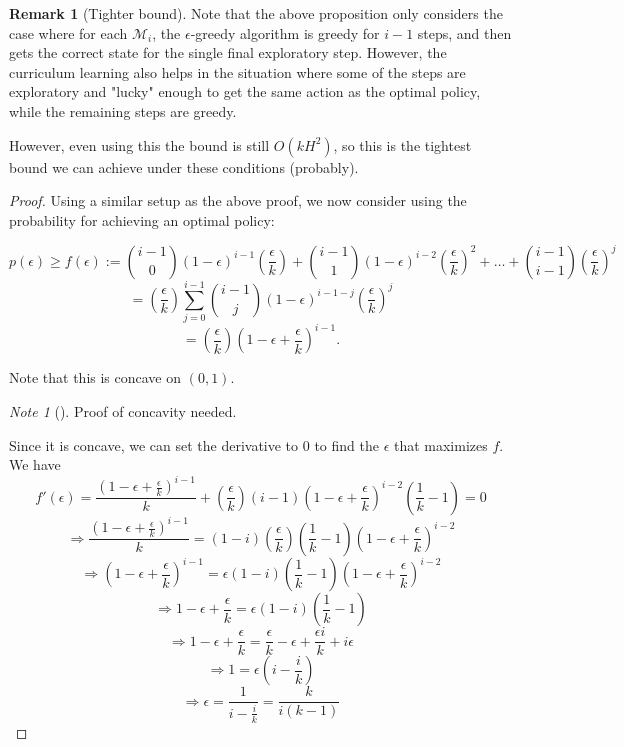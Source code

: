 \documentclass[12pt, letterpaper]{article}
\theoremstyle{definition}
\newtheorem*{rmk}{Remark}
\theoremstyle{remark}
\newtheorem*{note}{Note}
\begin{document}
\begin{rmk}[Tighter bound]
    Note that the above proposition only considers the case where for each \(\mathcal{M}_i\), the \(\epsilon\)-greedy algorithm is greedy for \(i-1\) steps, and then gets the correct state for the single final exploratory step. However, the curriculum learning also helps in the situation where some of the steps are exploratory and "lucky" enough to get the same action as the optimal policy, while the remaining steps are greedy.

    However, even using this the bound is still $O(kH^2)$, so this is the tightest bound we can achieve under these conditions (probably).
\end{rmk}

\begin{proof}[Proof]
    Using a similar setup as the above proof, we now consider using the probability for achieving an optimal policy:

    \[p(\epsilon) \geq f(\epsilon) := {i-1 \choose 0} (1-\epsilon)^{i-1}(\frac{\epsilon}{k}) + {i-1 \choose 1}(1-\epsilon)^{i-2}(\frac{\epsilon}{k})^2 + \ldots + {i-1 \choose i-1} (\frac{\epsilon}{k})^j\]
    \[= (\frac{\epsilon}{k})\sum_{j=0}^{i-1}{i-1 \choose j} (1-\epsilon)^{i-1-j}(\frac{\epsilon}{k})^{j}\]
    \[= (\frac{\epsilon}{k})(1-\epsilon + \frac{\epsilon}{k})^{i-1}.\]

    Note that this is concave on \((0, 1)\).
    \begin{note}[]
        \color{red}
        Proof of concavity needed.
    \end{note}

    Since it is concave, we can set the derivative to 0 to find the \(\epsilon\) that maximizes \(f\). We have
    \[f'(\epsilon) = \frac{(1-\epsilon + \frac{\epsilon}{k})^{i-1}}{k} + (\frac{\epsilon}{k}) (i-1) (1 - \epsilon + \frac{\epsilon}{k})^{i-2}(\frac{1}{k} - 1) = 0\]
    \[\Rightarrow \frac{(1 - \epsilon + \frac{\epsilon}{k})^{i-1}}{k} = (1-i)(\frac{\epsilon}{k})(\frac{1}{k} - 1)(1 - \epsilon + \frac{\epsilon}{k})^{i-2}\]
    \[\Rightarrow (1 - \epsilon + \frac{\epsilon}{k})^{i-1} = \epsilon (1-i) (\frac{1}{k} - 1) (1 - \epsilon+ \frac{\epsilon}{k})^{i-2}\]
    \[\Rightarrow 1 - \epsilon + \frac{\epsilon}{k} = \epsilon (1-i) (\frac{1}{k} - 1)\]
    \[\Rightarrow 1 - \epsilon + \frac{\epsilon}{k} = \frac{\epsilon}{k} - \epsilon + \frac{\epsilon i}{k} + i \epsilon\]
    \[\Rightarrow 1 = \epsilon(i - \frac{i}{k})\]
    \[\Rightarrow \epsilon = \frac{1}{i - \frac{i}{k}} = \frac{k}{i(k-1)}\]


\end{proof}
\end{document}
